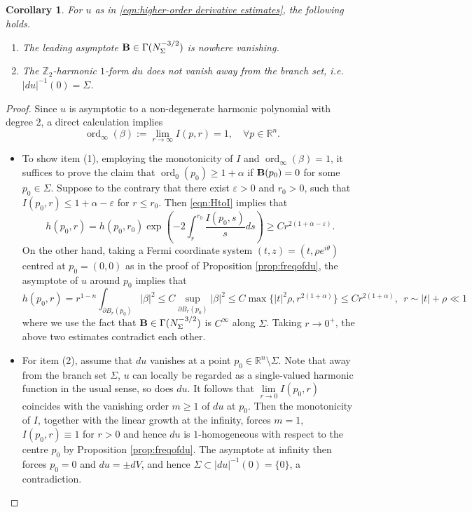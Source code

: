 \documentclass[11pt,a4paper]{article}
\numberwithin{equation}{section}%
\newtheorem{cor}[thm]{Corollary}
\theoremstyle{definition}
\newcommand{\ie}{\emph{i.e.} }
\newcommand{\R}{\mathbb{R}}
\newcommand{\Z}{\mathbb{Z}}
\begin{document}
\begin{cor}\label{cor:freqofdu}
    For $u$ as in \eqref{eqn:higher-order derivative estimates}, the following holds.  
    \begin{enumerate}
        \item [\textnormal{(1)}] The leading asymptote ${\bf{B}}\in \Gamma(N_{\Sigma}^{-3/2})$ is nowhere vanishing. 
        \item [\textnormal{(2)}] The $\Z_2$-harmonic $1$-form $du$ does not vanish away from the branch set, \ie $|du|^{-1}(0)=\Sigma$. 
    \end{enumerate}
\end{cor}
\begin{proof}Since $u$ is asymptotic to a non-degenerate harmonic polynomial with degree $2$, a direct calculation implies
$$\operatorname{ord}_\infty(\beta):=\lim_{r\to \infty}I(p,r)=1,\quad \forall p\in \R^n.$$

\begin{itemize}
    \item To show item (1), employing the monotonicity of $I$ and $\operatorname{ord}_\infty(\beta)=1$, it suffices to prove the claim that $\operatorname{ord}_0(p_0)\geqslant 1+\alpha$ if ${\bf{B}}(p_0)=0$ for some $p_0\in \Sigma$. Suppose to the contrary that there exist $\varepsilon>0$ and $r_0>0$, such that 
    $I(p_0,r)\leqslant 1+\alpha-\varepsilon$ for $r\leqslant r_0$. Then \eqref{eqn:HtoI}
 implies that
 $$h(p_0,r)=h(p_0,r_0)\exp\left(-2\int_r^{r_0}\frac{I(p_0,s)}{s}ds\right)\geqslant Cr^{2(1+\alpha-\varepsilon)}.$$
 On the other hand, taking a Fermi coordinate system $(t,z)=(t,\rho e^{i\theta})$ centred at $p_0=(0,0)$ as in the proof of Proposition \ref{prop:freqofdu}, the asymptote of $u$ around $p_0$ implies that 
 $$h(p_0,r)=r^{1-n}\int_{\partial B_r(p_0)}|\beta|^2\leqslant C\sup_{\partial B_r(p_0)}|\beta|^2\leqslant C \max \{|t|^2\rho,r^{2(1+\alpha)}\}\leqslant Cr^{2(1+\alpha)},~~r\sim |t|+\rho\ll1$$
 where we use the fact that ${\bf B}\in \Gamma(N_\Sigma^{-3/2})$ is $C^\infty$ along $\Sigma$. Taking $r\to 0^+$, the above two estimates contradict each other.  
    \item For item (2), assume that $du$ vanishes at a point $p_0\in \R^n\setminus\Sigma$. Note that away from the branch set $\Sigma$, $u$ can locally be regarded as a single-valued harmonic function in the usual sense, so does $du$. It follows that $\lim\limits_{r\to 0}I(p_0,r)$ coincides with the vanishing order $m\geqslant 1$ of $du$ at $p_0$. Then the monotonicity of $I$, together with the linear growth at the infinity, forces $m=1$, $I(p_0,r)\equiv 1$ for $r>0$ and hence $du$ is $1$-homogeneous with respect to the centre $p_0$ by Proposition \ref{prop:freqofdu}. The asymptote at infinity then forces $p_0=0$ and $du=\pm dV$, and hence $\Sigma\subset |du|^{-1}(0)=\{0\}$, a contradiction. 
\end{itemize}
\end{proof}
\end{document}
